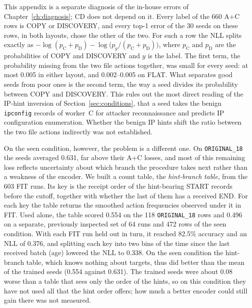 This appendix is a separate diagnosis of the in-house errors of
Chapter~\ref{ch:diagnosis}; CD does not depend on it. Every label of the 660 A+C rows is COPY or DISCOVERY, and every top-1
error of the 30 seeds on these rows, in both layouts, chose the other
of the two. For such a row the NLL splits exactly as
$-\log(p_{\mathrm{C}}+p_{\mathrm{D}})
 -\log\bigl(p_y/(p_{\mathrm{C}}+p_{\mathrm{D}})\bigr)$, where
$p_{\mathrm{C}}$ and $p_{\mathrm{D}}$ are the probabilities of COPY and
DISCOVERY and $y$ is the label. The first term, the probability missing
from the two file actions together, was small for every seed: at most
0.005 in either layout, and 0.002--0.005 on FLAT. What separates good
seeds from poor ones is the second term, the way a seed divides its
probability between COPY and DISCOVERY. This rules out the most direct
reading of the IP-hint inversion of Section~\ref{sec:conditions}, that a
seed takes the benign \texttt{ipconfig} records of worker~C for attacker
reconnaissance and predicts IP configuration enumeration. Whether the
benign IP hints shift the ratio between the two file actions indirectly
was not established.

On the seen condition, however, the problem is a different one. On
\texttt{ORIGINAL\_18} the seeds averaged 0.631, far above their A+C
losses, and most of this remaining loss reflects uncertainty about
which branch the procedure takes next rather than a weakness of the
encoder. We built a count table, the \emph{hint-branch table}, from
the 603 FIT runs. Its key is the receipt order of the hint-bearing START
records before the cutoff, together with whether the last of them has a
received END. For each key the table returns the smoothed action
frequencies observed under it in FIT. Used alone, the table scored 0.554 on the 118
\texttt{ORIGINAL\_18} rows and 0.496 on a separate, previously
inspected set of 64 runs and 472 rows of the seen condition. With each FIT
run held out in turn, it reached 82.5\% accuracy and an NLL of 0.376,
and splitting each key into two bins of the time since the last received
batch (age) lowered the NLL to 0.338. On the seen condition the
hint-branch table, which knows nothing about targets, thus did better
than the mean of the trained seeds (0.554 against 0.631). The trained
seeds were about 0.08 worse than a table that sees only the order of
the hints, so on this condition they have not used all that the hint
order offers; how much a better encoder could still gain there was not
measured.

